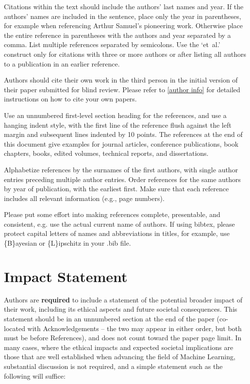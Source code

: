 \documentclass{article}
\theoremstyle{plain}
\theoremstyle{definition}
\theoremstyle{remark}
\begin{document}
Citations within the text should include the authors' last names and
year. If the authors' names are included in the sentence, place only
the year in parentheses, for example when referencing Arthur Samuel's
pioneering work. Otherwise place the entire
reference in parentheses with the authors and year separated by a
comma. List multiple references separated by
semicolons. Use the `et~al.'
construct only for citations with three or more authors or after
listing all authors to a publication in an earlier reference.

Authors should cite their own work in the third person
in the initial version of their paper submitted for blind review.
Please refer to \cref{author info} for detailed instructions on how to
cite your own papers.

Use an unnumbered first-level section heading for the references, and use a
hanging indent style, with the first line of the reference flush against the
left margin and subsequent lines indented by 10 points. The references at the
end of this document give examples for journal articles,
conference publications, book chapters, books, edited volumes, technical reports, and dissertations.

Alphabetize references by the surnames of the first authors, with
single author entries preceding multiple author entries. Order
references for the same authors by year of publication, with the
earliest first. Make sure that each reference includes all relevant
information (e.g., page numbers).

Please put some effort into making references complete, presentable, and
consistent, e.g. use the actual current name of authors.
If using bibtex, please protect capital letters of names and
abbreviations in titles, for example, use \{B\}ayesian or \{L\}ipschitz
in your .bib file.

\section*{Impact Statement}

Authors are \textbf{required} to include a statement of the potential 
broader impact of their work, including its ethical aspects and future 
societal consequences. This statement should be in an unnumbered 
section at the end of the paper (co-located with Acknowledgements -- 
the two may appear in either order, but both must be before References), 
and does not count toward the paper page limit. In many cases, where 
the ethical impacts and expected societal implications are those that 
are well established when advancing the field of Machine Learning, 
substantial discussion is not required, and a simple statement such 
as the following will suffice:
\end{document}
